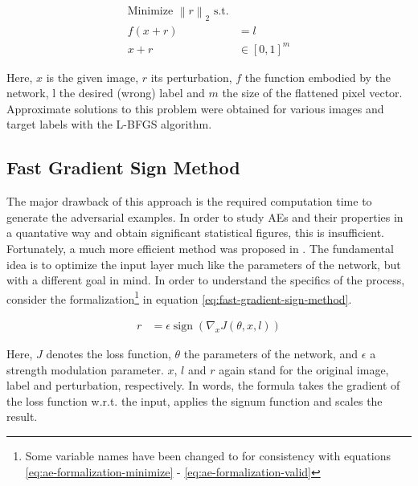 \documentclass[11pt, a4paper]{article}
\newcommand\braces[1]{\left(#1\right)}
\newcommand\brackets[1]{\left[#1\right]}
\renewcommand{\vec}[1]{\underline{#1}}
\newcommand{\mat}[1]{\underline{\underline{#1}}}
\newcommand{\norm}[1]{\left\lVert#1\right\rVert}
\DeclareMathOperator{\sign}{sign}
\begin{document}
\begin{align}
	\text{Minimize $\norm{r}_2$ s.t.} \label{eq:ae-formalization-minimize} \\
	f(x + r) &= l \label{eq:ae-formalization-label} \\
	x + r &\in \brackets{0, 1}^m \label{eq:ae-formalization-valid}
\end{align}

Here, $x$ is the given image, $r$ its perturbation, $f$ the function embodied by the network, l the desired (wrong) label and $m$ the size of the flattened pixel vector. Approximate solutions to this problem were obtained for various images and target labels with the L-BFGS algorithm.

\subsection{Fast Gradient Sign Method}
\label{sec:fast-gradient-sign-method}
The major drawback of this approach is the required computation time to generate the adversarial examples. In order to study AEs and their properties in a quantative way and obtain significant statistical figures, this is insufficient. Fortunately, a much more efficient method was proposed in \cite{explaining-and-harnessing-adversarial-examples}. The fundamental idea is to optimize the input layer much like the parameters of the network, but with a different goal in mind. In order to understand the specifics of the process, consider the formalization\footnote{Some variable names have been changed to for consistency with equations \eqref{eq:ae-formalization-minimize} - \eqref{eq:ae-formalization-valid}} in equation \eqref{eq:fast-gradient-sign-method}.

\begin{align}
	r &= \epsilon \sign \braces{\nabla_x J\braces{\theta, x, l}} \label{eq:fast-gradient-sign-method}
\end{align}

Here, $J$ denotes the loss function, $\theta$ the parameters of the network, and $\epsilon$ a strength modulation parameter. $x$, $l$ and $r$ again stand for the original image, label and perturbation, respectively. In words, the formula takes the gradient of the loss function w.r.t. the input, applies the signum function and scales the result.
\end{document}
